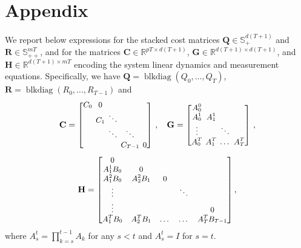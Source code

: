 \documentclass[letterpaper, 10 pt, conference]{ieeeconf}  %
\theoremstyle{ieeeconf}
\newcommand{\R}{\mathbb{R}}
\newcommand{\Symm}{\mathbb{S}}
\begin{document}
\section{Appendix}
\label{appendix}
We report below expressions for the stacked cost matrices $\mathbf{Q} \in\Symm_+^{d(T+1)}$ and $\mathbf{R}\in\Symm_{++}^{mT}$, and for the matrices $\mathbf{C} \in \R^{pT\times d(T +1)}$, $\mathbf{G} \in \R ^{d(T +1)\times d(T +1)}$, and $\mathbf{H} \in \R^{d(T +1)\times mT}$ encoding the system linear dynamics and measurement equations. Specifically, we have $\mathbf{Q} = \operatorname{blkdiag} (Q_0, \dots, Q_T)$, $\mathbf{R} = \operatorname{blkdiag} (R_0, \dots, R_{T-1})$ and 
\begin{equation*}
{\small \mathbf{C}=\setlength\arraycolsep{2pt}\begin{bmatrix}
C_0 & 0 &  &  & \\
 & C_1 & \ddots & & \\
 &  & \ddots & \ddots & \\
 &  & & C_{T-1} & 0
\end{bmatrix}\,, \quad
\mathbf{G}=\begin{bmatrix}
    A^0_0 & & & \\
A_0^1 & A_1^1 & & \\
\vdots & & \ddots & \\
A^{T}_0 & A^{T}_1 & \dots & A^T_T
\end{bmatrix}\,,}
\end{equation*}
\begin{equation*}
{\small
\mathbf{H}=
\begin{bmatrix}
0 & & & & \\
A^1_1B_0 & 0 & & & \\
A_1^2B_0 & A_2^2B_1 & 0 & & \\
\vdots & & & \ddots & \\
\vdots & & & & 0 \\
A^{T}_1 B_0 & A^{T}_2 B_1 & \dots & \dots & A^T_TB_{T-1}
\end{bmatrix},}
\end{equation*}
where $A^t_s = \prod\limits_{k=s}^{t-1} A_k$ for any $s<t$ and $A_s^t = I$ for $s=t$.
\end{document}
